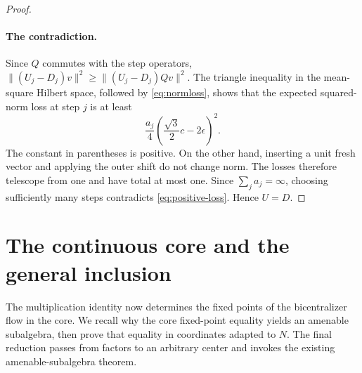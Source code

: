 \documentclass[11pt]{article}
\theoremstyle{definition}
\begin{document}
\begin{proof}
\paragraph{The contradiction.}
Since $Q$ commutes with the step operators,
$\|(U_j-D_j)v\|^2\ge\|(U_j-D_j)Qv\|^2$.
The triangle inequality in the mean-square Hilbert space, followed by
\eqref{eq:normloss}, shows that the expected squared-norm loss at step $j$
is at least
\begin{equation}\label{eq:positive-loss}
 \frac{a_j}{4}\left(\frac{\sqrt3}{2}c-2\epsilon\right)^2.
\end{equation}
The constant in parentheses is positive. On the other hand, inserting a
unit fresh vector and applying the outer shift do not change norm. The
losses therefore telescope from one and have total at most one. Since
$\sum_j a_j=\infty$, choosing sufficiently many steps contradicts
\eqref{eq:positive-loss}. Hence $U=D$.
\end{proof}
\section{The continuous core and the general inclusion}\label{sec:core}
The multiplication identity now determines the fixed points of the
bicentralizer flow in the core. We recall why the core fixed-point equality
yields an amenable subalgebra, then prove that equality in coordinates
adapted to $N$. The final reduction passes from factors to an arbitrary center and invokes the
existing amenable-subalgebra theorem.
\end{document}
